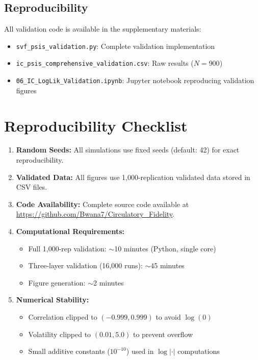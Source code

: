 \documentclass[10pt]{article} %
\theoremstyle{plain}
\theoremstyle{definition}
\begin{document}
\subsection{Reproducibility}

All validation code is available in the supplementary materials:
\begin{itemize}[nosep]
    \item \texttt{svf\_psis\_validation.py}: Complete validation implementation
    \item \texttt{ic\_psis\_comprehensive\_validation.csv}: Raw results ($N = 900$)
    \item \texttt{06\_IC\_LogLik\_Validation.ipynb}: Jupyter notebook reproducing validation figures
\end{itemize}


\section{Reproducibility Checklist}
\label{app:reproducibility}

\begin{enumerate}
\item \textbf{Random Seeds:} All simulations use fixed seeds (default: 42) for exact reproducibility.

\item \textbf{Validated Data:} All figures use 1,000-replication validated data stored in CSV files.

\item \textbf{Code Availability:} Complete source code available at \url{https://github.com/Bwana7/Circulatory_Fidelity}.

\item \textbf{Computational Requirements:}
\begin{itemize}
\item Full 1,000-rep validation: $\sim$10 minutes (Python, single core)
\item Three-layer validation (16,000 runs): $\sim$45 minutes
\item Figure generation: $\sim$2 minutes
\end{itemize}

\item \textbf{Numerical Stability:}
\begin{itemize}
\item Correlation clipped to $(-0.999, 0.999)$ to avoid $\log(0)$
\item Volatility clipped to $(0.01, 5.0)$ to prevent overflow
\item Small additive constants ($10^{-10}$) used in $\log|\cdot|$ computations
\end{itemize}
\end{enumerate}


\small
\end{document}
